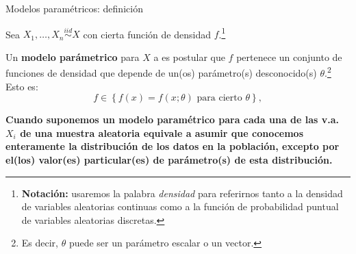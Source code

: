 \documentclass{beamer}
\title{\color{black}{Análisis Estadístico}}
\subtitle{\color{rosee}Modelos Paramétricos y Método de Momentos\\ \color{rosee} Propiedades de la distribución exponencial\\\color{rosee} Estimación Puntual II}
\institute[]{UTDT}
\date[UTDT 2022]{}
\theoremstyle{definition}
\begin{document}
\begin{frame}
  \titlepage
\end{frame}


{%





\begin{frame}{\color{rosee}Modelos param\'etricos: definición}
  
    Sea $X_{1},\dots,X_{n}\stackrel{iid}{\sim}X$ con cierta funci\'on de densidad $f$.\footnote{\textbf{Notación:} usaremos la palabra \textit{densidad} para referirnos tanto a
    la densidad de variables aleatorias continuas como a la
    funci\'on de probabilidad puntual de variables aleatorias discretas.} 
    
    Un \textbf{modelo par\'ametrico}
    para $X$ a es postular que $f$
    pertenece un conjunto de funciones de densidad que depende de un(os)
    par\'ametro(s) desconocido(s) $\theta$.\footnote{Es decir, $\theta$ puede ser un parámetro escalar o un vector.} Esto es:
    \[f \in \left\{ f(x)=f(x;\theta) \text{ para cierto
      }\theta\right\},\]
  
  \vspace{6pt}
  
\textbf{    Cuando suponemos un modelo param\'etrico para cada una de las v.a. $X_i$ de una muestra aleatoria equivale a asumir que conocemos enteramente la distribuci\'on de los datos en la población, excepto por el(los) valor(es) particular(es) de  par\'ametro(s) de esta distribución.}
  
\end{frame}

}
\end{document}

